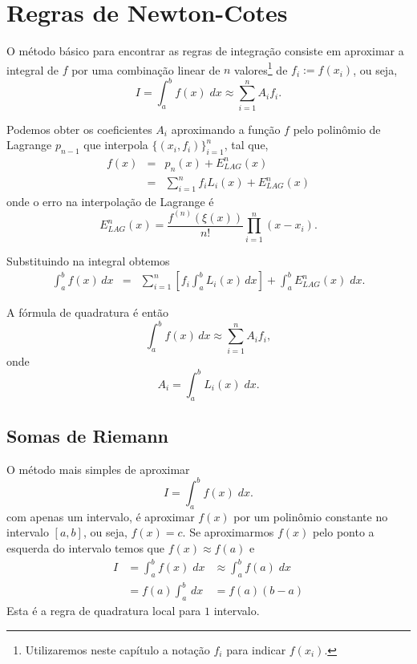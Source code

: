 \section{Regras de Newton-Cotes}

O método básico para encontrar as regras de integração consiste em aproximar a integral de $f$ por uma combinação linear de $n$ valores\footnote{Utilizaremos neste capítulo a notação $f_i$ para indicar $f(x_i)$.} de $f_i := f(x_i)$, ou seja,
$$
 I = \int_a^b f(x) \;dx \approx \sum_{i=1}^nA_if_i.
$$


Podemos obter os coeficientes $A_i$ aproximando a função $f$ pelo polinômio de Lagrange $p_{n-1}$ que interpola $\{(x_i,f_i)\}_{i=1}^n$, tal que,
\begin{eqnarray}
  f(x) &=& p_n(x)+E^n_{LAG}(x) \\
       &=& \sum_{i=1}^n f_iL_i(x)+E^n_{LAG}(x)
\end{eqnarray}
onde o erro na interpolação de Lagrange é
\begin{equation}
   E^n_{LAG}(x)=\frac{f^{(n)}(\xi(x))}{n!}\prod_{i=1}^n(x-x_i).
\end{equation}

Substituindo na integral obtemos
\begin{eqnarray}
  \int_a^bf(x)\,dx &=& \sum_{i=1}^n\left[f_i\int_a^bL_i(x)\,dx\right] +  \int_a^b E^n_{LAG}(x) \;dx.
\end{eqnarray}


A fórmula de quadratura é então
\begin{equation}
\int_a^bf(x)\,dx\approx\sum_{i=1}^nA_if_i,
\end{equation}
onde
\begin{equation}
A_i=\int_a^b L_i(x)\;dx.
\end{equation}


\subsection{Somas de Riemann}
O método mais simples de aproximar
$$
 I = \int_a^b f(x) \;dx.
$$
com apenas um intervalo, é aproximar $f(x)$ por um polinômio constante no intervalo $[a,b]$, ou seja, $f(x)=c$. Se aproximarmos $f(x)$ pelo ponto a esquerda do intervalo temos que $f(x)\approx f(a)$ e
\begin{eqnarray}
 I &= \int_a^b f(x) \;dx
   &\approx \int_a^b f(a) \;dx \\
   &= f(a) \int_a^b\,dx
   &= f(a) (b-a)
\end{eqnarray}
Esta é a regra de quadratura local para $1$ intervalo.

